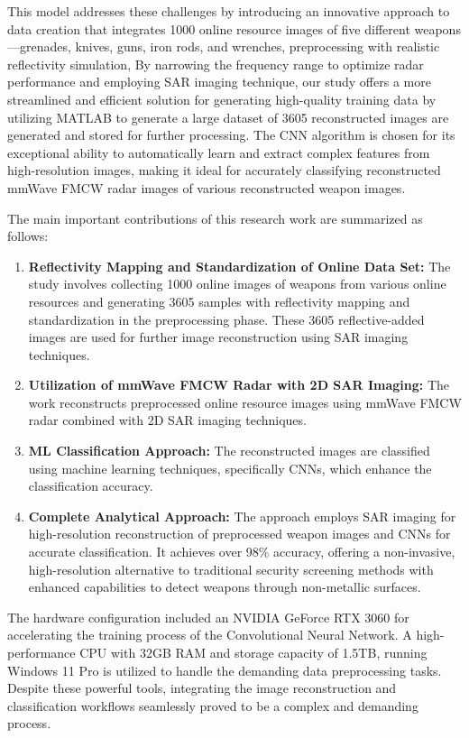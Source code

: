 \documentclass[journal,article,submit,pdftex,moreauthors]{Definitions/mdpi}
\begin{document}
This model addresses these challenges by introducing an innovative approach to data creation that integrates 1000 online resource images of five different weapons—grenades, knives, guns, iron rods, and wrenches, preprocessing with realistic reflectivity simulation, By narrowing the frequency range to optimize radar performance and employing SAR imaging technique, our study offers a more streamlined and efficient solution for generating high-quality training data by utilizing MATLAB to generate a large dataset of 3605 reconstructed images are generated and stored for further processing. The CNN algorithm is chosen for its exceptional ability to automatically learn and extract complex features from high-resolution images, making it ideal for accurately classifying reconstructed mmWave FMCW radar images of various reconstructed weapon images.

The main important contributions of this research work are summarized as follows:
\begin{enumerate}
    \item \textbf{Reflectivity Mapping and Standardization of Online Data Set:} The study involves collecting 1000 online images of weapons from various online resources and generating 3605 samples with reflectivity mapping and standardization in the preprocessing phase. These 3605 reflective-added images are used for further image reconstruction using SAR imaging techniques.
    \item \textbf{Utilization of mmWave FMCW Radar with 2D SAR Imaging:} The work reconstructs preprocessed online resource images using mmWave FMCW radar combined with 2D SAR imaging techniques.
    \item \textbf{ML Classification Approach:} The reconstructed images are classified using machine learning techniques, specifically CNNs, which enhance the classification accuracy.
    \item \textbf{Complete Analytical Approach:} The approach employs SAR imaging for high-resolution reconstruction of preprocessed weapon images and CNNs for accurate classification. It achieves over 98\% accuracy, offering a non-invasive, high-resolution alternative to traditional security screening methods with enhanced capabilities to detect weapons through non-metallic surfaces.
\end{enumerate}

The hardware configuration included an NVIDIA GeForce RTX 3060 for accelerating the training process of the Convolutional Neural Network. A high-performance CPU with 32GB RAM and storage capacity of 1.5TB, running Windows 11 Pro is utilized to handle the demanding data preprocessing tasks. Despite these powerful tools, integrating the image reconstruction and classification workflows seamlessly proved to be a complex and demanding process.
\end{document}
